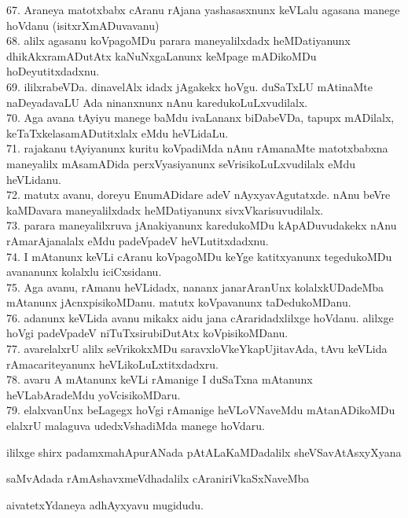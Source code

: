 \documentclass{article}
\begin{document}
67. Araneya matotxbabx cAranu rAjana yashasasxnunx keVLalu agasana manege hoVdanu (isitxrXmADuvavanu)\\
68. alilx agasanu koVpagoMDu parara maneyalilxdadx heMDatiyanunx dhikAkxramADutAtx kaNuNxgaLanunx keMpage mADikoMDu hoDeyutitxdadxnu.\\
69. ililxrabeVDa. dinavelAlx idadx jAgakekx hoVgu. duSaTxLU mAtinaMte naDeyadavaLU Ada ninanxnunx nAnu karedukoLuLxvudilalx.\\
70. Aga avana tAyiyu manege baMdu ivaLananx biDabeVDa, tapupx mADilalx, keTaTxkelasamADutitxlalx eMdu heVLidaLu.\\
71. rajakanu tAyiyanunx kuritu koVpadiMda nAnu rAmanaMte matotxbabxna maneyalilx mAsamADida perxVyasiyanunx seVrisikoLuLxvudilalx eMdu heVLidanu.\\
72. matutx avanu, doreyu EnumADidare adeV nAyxyavAgutatxde. nAnu beVre kaMDavara maneyalilxdadx heMDatiyanunx sivxVkarisuvudilalx.\\
73. parara maneyalilxruva jAnakiyanunx karedukoMDu kApADuvudakekx nAnu rAmarAjanalalx eMdu padeVpadeV heVLutitxdadxnu.\\
74. I mAtanunx keVLi cAranu koVpagoMDu keYge katitxyanunx tegedukoMDu avananunx kolalxlu iciCxsidanu.\\
75. Aga avanu, rAmanu heVLidadx, nananx janarAranUnx kolalxkUDadeMba mAtanunx jAcnxpisikoMDanu. matutx koVpavanunx taDedukoMDanu.\\
76. adanunx keVLida avanu mikakx aidu jana cAraridadxlilxge hoVdanu. alilxge hoVgi padeVpadeV niTuTxsirubiDutAtx koVpisikoMDanu.\\
77. avarelalxrU alilx seVrikokxMDu saravxloVkeYkapUjitavAda, tAvu keVLida rAmacariteyanunx heVLikoLuLxtitxdadxru.\\
78. avaru A mAtanunx keVLi rAmanige I duSaTxna mAtanunx heVLabAradeMdu yoVcisikoMDaru.\\
79. elalxvanUnx beLagegx hoVgi rAmanige heVLoVNaveMdu mAtanADikoMDu elalxrU malaguva udedxVshadiMda manege hoVdaru.

\begin{center}
ililxge shirx padamxmahApurANada pAtALaKaMDadalilx sheVSavAtAsxyXyana
\end{center}

\begin{center}
saMvAdada rAmAshavxmeVdhadalilx cAraniriVkaSxNaveMba
\end{center}

\begin{center}
aivatetxYdaneya adhAyxyavu mugidudu.
\end{center}
\end{document}
